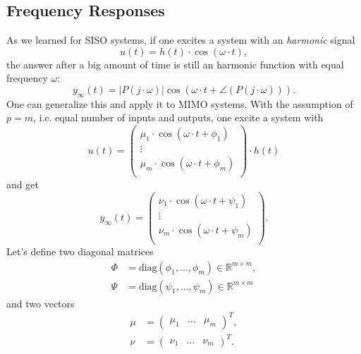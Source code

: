 \documentclass[a4paper,12 pt]{article}
\numberwithin{equation}{section}
\theoremstyle{definition}
\theoremstyle{remark}
\theoremstyle{definition}
\theoremstyle{definition}
\theoremstyle{definition}
\theoremstyle{remark}
\begin{document}
\subsection{Frequency Responses}
As we learned for SISO systems, if one excites a system with an \textit{harmonic} signal
\begin{equation}
u(t)=h(t)\cdot \cos(\omega \cdot t),
\end{equation}
the answer after a big amount of time is still an harmonic function with equal frequency $\omega$:
\begin{equation}
y_{\infty}(t)=|P(j\cdot \omega)| \cos(\omega \cdot t+\angle(P(j\cdot \omega))).
\end{equation}
One can generalize this and apply it to MIMO systems. With the assumption of $p=m$, i.e. equal number of inputs and outputs, one excite a system with
\begin{equation}
u(t)=\begin{pmatrix}
\mu_1\cdot \cos (\omega \cdot t + \phi_1)\\
\vdots\\
\mu_m\cdot \cos (\omega \cdot t + \phi_m)\\
\end{pmatrix}\cdot h(t)
\end{equation}
and get
\begin{equation}
y_{\infty}(t)=\begin{pmatrix}
\nu_1\cdot \cos (\omega \cdot t + \psi_1)\\
\vdots\\
\nu_m\cdot \cos (\omega \cdot t + \psi_m)\\
\end{pmatrix}.
\end{equation}
Let's define two diagonal matrices
\begin{equation}
\begin{split}
\Phi &=\text{diag}(\phi_1,\hdots,\phi_m)\in \mathbb{R}^{m\times m},\\
\Psi &=\text{diag}(\psi_1,\hdots,\psi_m)\in \mathbb{R}^{m\times m}
\end{split}
\end{equation}
and two vectors
\begin{equation}
\begin{split}
\mu &=\begin{pmatrix}
\mu_1 &\hdots &\mu_m
\end{pmatrix}^T,  \\
\nu &=\begin{pmatrix}
\nu_1 &\hdots &\nu_m
\end{pmatrix}^T.
\end{split}
\end{equation}
\end{document}

